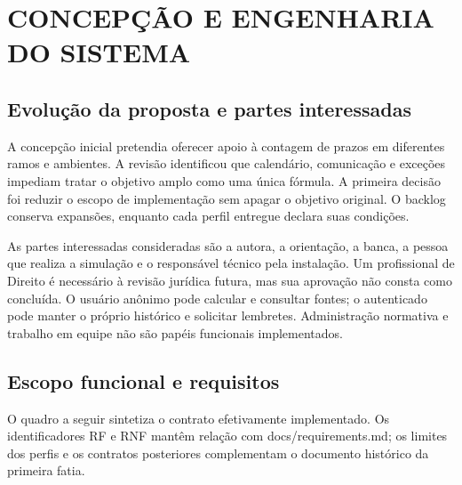 \chapter{CONCEPÇÃO E ENGENHARIA DO SISTEMA}
\label{chapter-4}
\section{Evolução da proposta e partes interessadas}
\label{section-4-1}
A concepção inicial pretendia oferecer apoio à contagem de prazos em diferentes ramos e ambientes. A revisão identificou que calendário, comunicação e exceções impediam tratar o objetivo amplo como uma única fórmula. A primeira decisão foi reduzir o escopo de implementação sem apagar o objetivo original. O backlog conserva expansões, enquanto cada perfil entregue declara suas condições.

As partes interessadas consideradas são a autora, a orientação, a banca, a pessoa que realiza a simulação e o responsável técnico pela instalação. Um profissional de Direito é necessário à revisão jurídica futura, mas sua aprovação não consta como concluída. O usuário anônimo pode calcular e consultar fontes; o autenticado pode manter o próprio histórico e solicitar lembretes. Administração normativa e trabalho em equipe não são papéis funcionais implementados.

\section{Escopo funcional e requisitos}
\label{section-4-2}
O quadro a seguir sintetiza o contrato efetivamente implementado. Os identificadores RF e RNF mantêm relação com docs/requirements.md; os limites dos perfis e os contratos posteriores complementam o documento histórico da primeira fatia.

